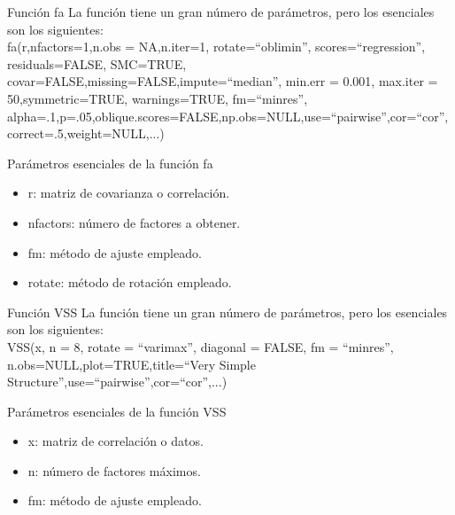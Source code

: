 \documentclass[10pt]{beamer}
\begin{document}
\begin{frame}[fragile]{Función fa}
La función tiene un gran número de parámetros, pero los esenciales son los siguientes:\\
\vspace{10px}
fa(r,nfactors=1,n.obs = NA,n.iter=1, rotate=``oblimin'', scores=``regression'', 
residuals=FALSE, SMC=TRUE, covar=FALSE,missing=FALSE,impute=``median'',
min.err = 0.001,  max.iter = 50,symmetric=TRUE, warnings=TRUE, fm=``minres'',
alpha=.1,p=.05,oblique.scores=FALSE,np.obs=NULL,use=``pairwise'',cor=``cor'',
correct=.5,weight=NULL,...)
\vspace{10px}
\begin{block}{Parámetros esenciales de la función fa}
	\begin{itemize}
		\item r: matriz de covarianza o correlación.
		\item nfactors: número de factores a obtener.
		\item fm: método de ajuste empleado.
		\item rotate: método de rotación empleado.
	\end{itemize}
\end{block}
\end{frame}

\begin{frame}[fragile]{Función VSS}
La función tiene un gran número de parámetros, pero los esenciales son los siguientes:\\
\vspace{10px}
VSS(x, n = 8, rotate = ``varimax'', diagonal = FALSE, fm = ``minres'', 
n.obs=NULL,plot=TRUE,title=``Very Simple Structure'',use=``pairwise'',cor=``cor'',...)
\vspace{10px}
\begin{block}{Parámetros esenciales de la función VSS}
	\begin{itemize}
		\item x: matriz de correlación o datos.
		\item n: número de factores máximos.
		\item fm: método de ajuste empleado.
	\end{itemize}
\end{block}
\end{frame}
\end{document}
